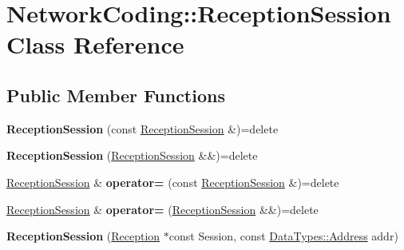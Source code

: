 \hypertarget{class_network_coding_1_1_reception_session}{}\section{Network\+Coding\+:\+:Reception\+Session Class Reference}
\label{class_network_coding_1_1_reception_session}
\subsection*{Public Member Functions}
\begin{DoxyCompactItemize}
\item 
{\bfseries Reception\+Session} (const \hyperlink{class_network_coding_1_1_reception_session}{Reception\+Session} \&)=delete\hypertarget{class_network_coding_1_1_reception_session_a4dd8055cd68c112e013961467b65d8f1}{}\label{class_network_coding_1_1_reception_session_a4dd8055cd68c112e013961467b65d8f1}

\item 
{\bfseries Reception\+Session} (\hyperlink{class_network_coding_1_1_reception_session}{Reception\+Session} \&\&)=delete\hypertarget{class_network_coding_1_1_reception_session_a8dbf8ae62db0e6264d5e5a39f795134c}{}\label{class_network_coding_1_1_reception_session_a8dbf8ae62db0e6264d5e5a39f795134c}

\item 
\hyperlink{class_network_coding_1_1_reception_session}{Reception\+Session} \& {\bfseries operator=} (const \hyperlink{class_network_coding_1_1_reception_session}{Reception\+Session} \&)=delete\hypertarget{class_network_coding_1_1_reception_session_a2f00293304a98eafcb58fa87758184c0}{}\label{class_network_coding_1_1_reception_session_a2f00293304a98eafcb58fa87758184c0}

\item 
\hyperlink{class_network_coding_1_1_reception_session}{Reception\+Session} \& {\bfseries operator=} (\hyperlink{class_network_coding_1_1_reception_session}{Reception\+Session} \&\&)=delete\hypertarget{class_network_coding_1_1_reception_session_a7ed969988ed2291db12ccc5c2be791d8}{}\label{class_network_coding_1_1_reception_session_a7ed969988ed2291db12ccc5c2be791d8}

\item 
{\bfseries Reception\+Session} (\hyperlink{class_network_coding_1_1_reception}{Reception} $\ast$const Session, const \hyperlink{class_network_coding_1_1_data_types_1_1_address}{Data\+Types\+::\+Address} addr)\hypertarget{class_network_coding_1_1_reception_session_a704be31ca772fe0e7752715ac6f50cce}{}\label{class_network_coding_1_1_reception_session_a704be31ca772fe0e7752715ac6f50cce}


\end{DoxyCompactItemize}
